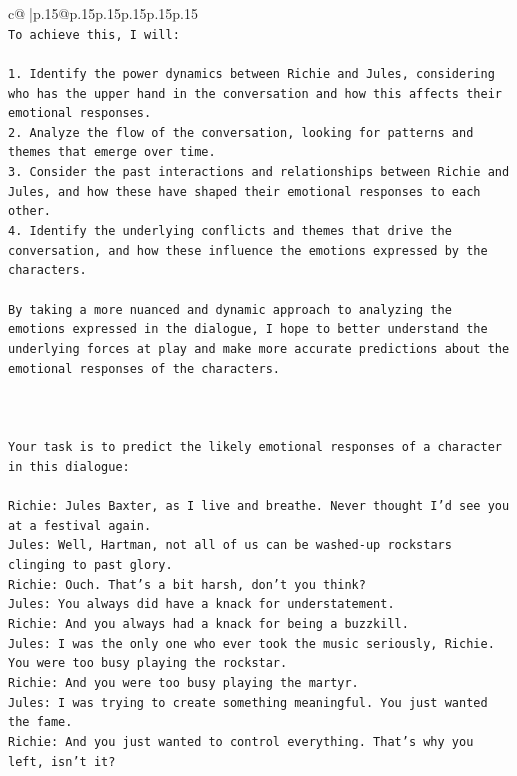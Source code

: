 \documentclass{article}
\begin{document}
{\begin{supertabular}{c@{$\;$}|p{.15\linewidth}@{}p{.15\linewidth}p{.15\linewidth}p{.15\linewidth}p{.15\linewidth}p{.15\linewidth}}
{{{\\ 
\texttt{To achieve this, I will:} \\
\\ 
\texttt{1. Identify the power dynamics between Richie and Jules, considering who has the upper hand in the conversation and how this affects their emotional responses.} \\
\texttt{2. Analyze the flow of the conversation, looking for patterns and themes that emerge over time.} \\
\texttt{3. Consider the past interactions and relationships between Richie and Jules, and how these have shaped their emotional responses to each other.} \\
\texttt{4. Identify the underlying conflicts and themes that drive the conversation, and how these influence the emotions expressed by the characters.} \\
\\ 
\texttt{By taking a more nuanced and dynamic approach to analyzing the emotions expressed in the dialogue, I hope to better understand the underlying forces at play and make more accurate predictions about the emotional responses of the characters.} \\
\\ 
\\ 
\\ 
\texttt{Your task is to predict the likely emotional responses of a character in this dialogue:} \\
\\ 
\texttt{Richie: Jules Baxter, as I live and breathe. Never thought I'd see you at a festival again.} \\
\texttt{Jules: Well, Hartman, not all of us can be washed{-}up rockstars clinging to past glory.} \\
\texttt{Richie: Ouch. That's a bit harsh, don't you think?} \\
\texttt{Jules: You always did have a knack for understatement.} \\
\texttt{Richie: And you always had a knack for being a buzzkill. } \\
\texttt{Jules: I was the only one who ever took the music seriously, Richie. You were too busy playing the rockstar.} \\
\texttt{Richie: And you were too busy playing the martyr. } \\
\texttt{Jules: I was trying to create something meaningful. You just wanted the fame.} \\
\texttt{Richie: And you just wanted to control everything. That's why you left, isn't it?} \\
}}}
\end{supertabular}}
\end{document}
